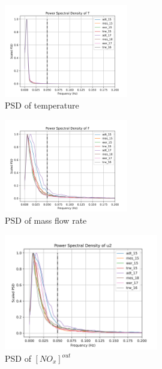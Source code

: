 \begin{multicols}{2}
       \begin{figure}[H]
        \centering
        \includegraphics[width=0.48\textwidth]{./figs/bfr_smth/truck_psd/T.png}
        \caption{PSD of temperature}
       \end{figure}

       \begin{figure}[H]
        \centering
        \includegraphics[width=0.48\textwidth]{./figs/bfr_smth/truck_psd/F.png}
        \caption{PSD of mass flow rate}
       \end{figure}
\end{multicols}

\begin{figure}[H]
        \centering
        \includegraphics[width=0.6\textwidth]{./figs/bfr_smth/truck_psd/u2.png}
        \caption{PSD of $[NO_x]^{out}$}
\end{figure}



